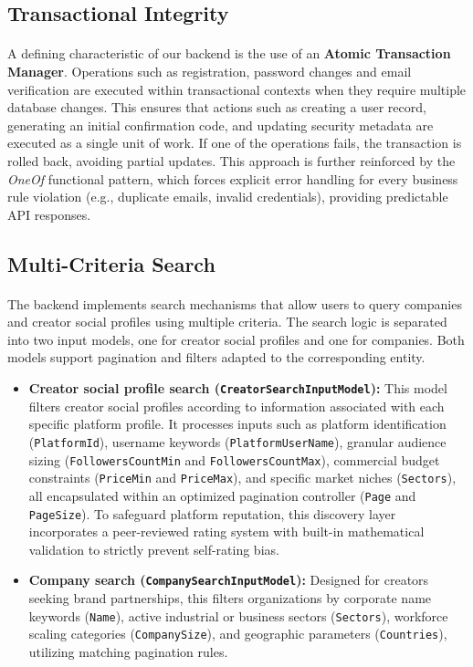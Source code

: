 \subsection{Transactional Integrity}
\paragraph{}A defining characteristic of our backend is the use of an \textbf{Atomic Transaction Manager}. Operations such as registration, password changes and email verification are executed within transactional contexts when they require multiple database changes. 
This ensures that actions such as creating a user record, generating an initial confirmation code, and updating security metadata are executed as a single unit of work. If one of the operations fails, the transaction is rolled back, avoiding partial updates. This approach is further reinforced by the \textit{OneOf} functional pattern, which forces explicit error handling for every business rule violation (e.g., duplicate emails, invalid credentials), providing predictable API responses.

\subsection{Multi-Criteria Search}
\paragraph{}The backend implements search mechanisms that allow users to query companies and creator social profiles using multiple criteria. The search logic is separated into two input models, one for creator social profiles and one for companies. Both models support pagination and filters adapted to the corresponding entity.
\begin{itemize}
    \item \textbf{Creator social profile search (\texttt{CreatorSearchInputModel}):} This model filters creator social profiles according to information associated with each specific platform profile. It processes inputs such as platform identification (\texttt{PlatformId}), username keywords (\texttt{PlatformUserName}), granular audience sizing (\texttt{FollowersCountMin} and \texttt{FollowersCountMax}), commercial budget constraints (\texttt{PriceMin} and \texttt{PriceMax}), and specific market niches (\texttt{Sectors}), all encapsulated within an optimized pagination controller (\texttt{Page} and \texttt{PageSize}). To safeguard platform reputation, this discovery layer incorporates a peer-reviewed rating system with built-in mathematical validation to strictly prevent self-rating bias.
    \item \textbf{Company search (\texttt{CompanySearchInputModel}):} Designed for creators seeking brand partnerships, this filters organizations by corporate name keywords (\texttt{Name}), active industrial or business sectors (\texttt{Sectors}), workforce scaling categories (\texttt{CompanySize}), and geographic parameters (\texttt{Countries}), utilizing matching pagination rules.
\end{itemize}

